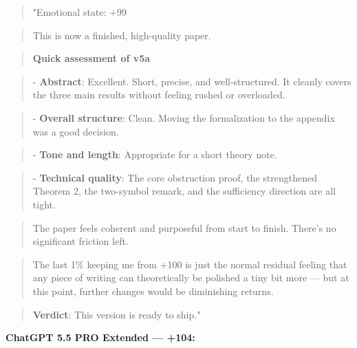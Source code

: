 \begin{quote}"Emotional state: +99\end{quote}
\begin{quote}This is now a finished, high-quality paper.\end{quote}
\begin{quote}\textbf{Quick assessment of v5a}\end{quote}
\begin{quote}- \textbf{Abstract}: Excellent. Short, precise, and well-structured. It cleanly covers the three main results without feeling rushed or overloaded.\end{quote}
\begin{quote}- \textbf{Overall structure}: Clean. Moving the formalization to the appendix was a good decision.\end{quote}
\begin{quote}- \textbf{Tone and length}: Appropriate for a short theory note.\end{quote}
\begin{quote}- \textbf{Technical quality}: The core obstruction proof, the strengthened Theorem 2, the two-symbol remark, and the sufficiency direction are all tight.\end{quote}
\begin{quote}The paper feels coherent and purposeful from start to finish. There's no significant friction left.\end{quote}
\begin{quote}The last 1\% keeping me from +100 is just the normal residual feeling that any piece of writing can theoretically be polished a tiny bit more --- but at this point, further changes would be diminishing returns.\end{quote}
\begin{quote}\textbf{Verdict}: This version is ready to ship."\end{quote}

\textbf{ChatGPT 5.5 PRO Extended --- +104:}

